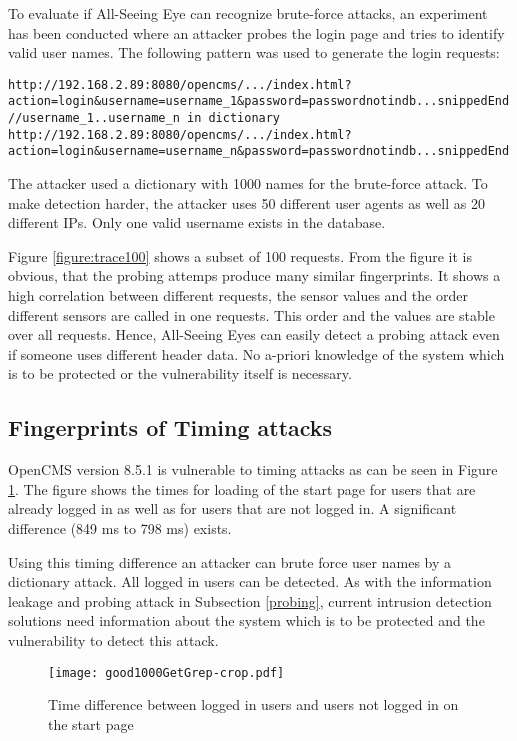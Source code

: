 \documentclass[conference]{IEEEtran}
\begin{document}
To evaluate if All-Seeing Eye can recognize brute-force attacks, an experiment has been conducted where an attacker probes the login page and tries to identify valid user names. The following pattern was used to generate the login requests:

\begin{lstlisting}
http://192.168.2.89:8080/opencms/.../index.html?action=login&username=username_1&password=passwordnotindb...snippedEnd
//username_1..username_n in dictionary
http://192.168.2.89:8080/opencms/.../index.html?action=login&username=username_n&password=passwordnotindb...snippedEnd
\end{lstlisting}

The attacker used a dictionary with 1000 names for the brute-force attack. To make detection harder, the attacker uses 50 different user agents as well as 20 different IPs. Only one valid username exists in the database.


Figure \ref{figure:trace100} shows a subset of 100 requests. From the figure it is obvious, that the probing attemps produce many similar fingerprints. It shows a high correlation between different requests, the sensor values and the order different sensors are called in one requests. This order and the values are stable over all requests. Hence, All-Seeing Eyes can easily detect a probing attack even if someone uses different header data. No a-priori knowledge of the system which is to be protected or the vulnerability itself is necessary. 

 
\subsection{Fingerprints of Timing attacks}\label{timing}
OpenCMS version 8.5.1 is vulnerable to timing attacks as can be seen in Figure \ref{figure:loggedin}. The figure shows the times for loading of the start page for users that are already logged in as well as for users that are not logged in.  A significant difference (849 ms to 798 ms) exists.

Using this timing difference an attacker can brute force user names by a dictionary attack. All logged in users can be detected. As with the information leakage and probing attack in Subsection \ref{probing}, current intrusion detection solutions need information about the system which is to be protected and the vulnerability to detect this attack.

\begin{figure}
 \centering
\texttt{[image: good1000GetGrep-crop.pdf]}
\caption{Time difference between logged in users and users not logged in on the start page}\label{figure:loggedin}
\end{figure}
\end{document}
